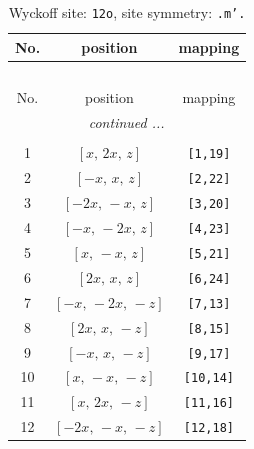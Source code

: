 \documentclass[fleqn,8pt]{jsarticle}
\begin{document}
\begin{longtable}{ccc}
\caption{Wyckoff site: {\tt 12o}, site symmetry: {\tt .m'.}}
 \\
 \hline \hline
No. & position & mapping \\ \hline \endfirsthead

\multicolumn{2}{l}{\tablename\ \thetable{}} \\
 \hline \hline
No. & position & mapping \\ \hline \endhead

 \hline \hline
\multicolumn{2}{r}{\footnotesize\it continued ...} \\ \endfoot

 \hline \hline
\multicolumn{2}{r}{} \\ \endlastfoot

1 & $\left[ x,\, 2 x,\, z \right]$ & {\tt [1,19]} \\ \hline
2 & $\left[ - x,\, x,\, z \right]$ & {\tt [2,22]} \\ \hline
3 & $\left[ - 2 x,\, - x,\, z \right]$ & {\tt [3,20]} \\ \hline
4 & $\left[ - x,\, - 2 x,\, z \right]$ & {\tt [4,23]} \\ \hline
5 & $\left[ x,\, - x,\, z \right]$ & {\tt [5,21]} \\ \hline
6 & $\left[ 2 x,\, x,\, z \right]$ & {\tt [6,24]} \\ \hline
7 & $\left[ - x,\, - 2 x,\, - z \right]$ & {\tt [7,13]} \\ \hline
8 & $\left[ 2 x,\, x,\, - z \right]$ & {\tt [8,15]} \\ \hline
9 & $\left[ - x,\, x,\, - z \right]$ & {\tt [9,17]} \\ \hline
10 & $\left[ x,\, - x,\, - z \right]$ & {\tt [10,14]} \\ \hline
11 & $\left[ x,\, 2 x,\, - z \right]$ & {\tt [11,16]} \\ \hline
12 & $\left[ - 2 x,\, - x,\, - z \right]$ & {\tt [12,18]} \\
\end{longtable}
\renewcommand{\arraystretch}{1.2}
\end{document}
